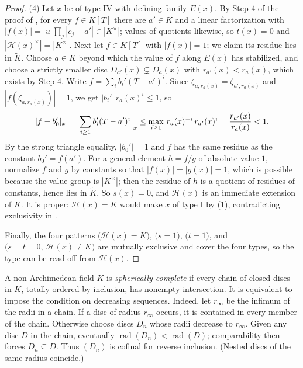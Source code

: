 \begin{proof}
(4) Let $x$ be of type IV with defining family $E(x)$.  By Step 4
of the proof of , for every
$f\in K[T]$ there are $a'\in K$ and a linear factorization with
$|f(x)|=|u|\prod_j|c_j-a'|\in|K^\times|$; values of quotients
likewise, so $t(x)=0$ and $|\mathcal H(x)^\times|=|K^\times|$.
Next let $f\in K[T]$ with $|f(x)|=1$; we claim its residue lies in
$\widetilde K$.  Choose $a\in K$ beyond which the value of $f$
along $E(x)$ has stabilized, and choose a strictly smaller disc
$D_{a'}(x)\subsetneq D_a(x)$ with $r_{a'}(x)<r_a(x)$, which exists
by Step 4.  Write $f=\sum_ib_i'(T-a')^i$.  Since
$\zeta_{a,r_a(x)}=\zeta_{a',r_a(x)}$ and
$|f(\zeta_{a,r_a(x)})|=1$, we get $|b_i'|\,r_a(x)^i\leq1$, so
\[
 |f-b_0'|_x=\Bigl|\sum_{i\geq1}b_i'(T-a')^i\Bigr|_x
 \leq\max_{i\geq1}\,r_a(x)^{-i}\,r_{a'}(x)^i
 =\frac{r_{a'}(x)}{r_a(x)}<1 .
\]
By the strong triangle equality, $|b_0'|=1$ and $f$ has the same
residue as the constant $b_0'=f(a')$.  For a general element
$h=f/g$ of absolute value $1$, normalize $f$ and $g$ by
constants so that $|f(x)|=|g(x)|=1$, which is possible because the
value group is $|K^\times|$; then the residue of $h$ is a quotient
of residues of constants, hence lies in $\widetilde K$.  So
$s(x)=0$, and $\mathcal H(x)$ is an immediate extension of $K$.
It is proper: $\mathcal H(x)=K$ would make $x$ of type I by (1),
contradicting exclusivity in .

Finally, the four patterns
$\bigl(\mathcal H(x)=K\bigr)$, $\bigl(s=1\bigr)$,
$\bigl(t=1\bigr)$, and
$\bigl(s=t=0,\ \mathcal H(x)\neq K\bigr)$ are mutually exclusive and
cover the four types, so the type can be read off from
$\mathcal H(x)$.
\end{proof}

\begin{definition}
\label{def:berk-spherical-completeness}
A non-Archimedean field $K$ is \emph{spherically complete} if every
chain of closed discs in $K$, totally ordered by inclusion, has
nonempty intersection.  It is equivalent to impose the condition on
decreasing sequences.  Indeed, let $r_\infty$ be the infimum of the
radii in a chain.  If a disc of radius $r_\infty$ occurs, it is contained
in every member of the chain.  Otherwise choose discs $D_n$ whose radii
decrease to $r_\infty$.  Given any disc $D$ in the chain, eventually
$\operatorname{rad}(D_n)<\operatorname{rad}(D)$; comparability then
forces $D_n\subseteq D$.  Thus $(D_n)$ is cofinal for reverse
inclusion.  (Nested discs of the same radius coincide.)
\end{definition}

